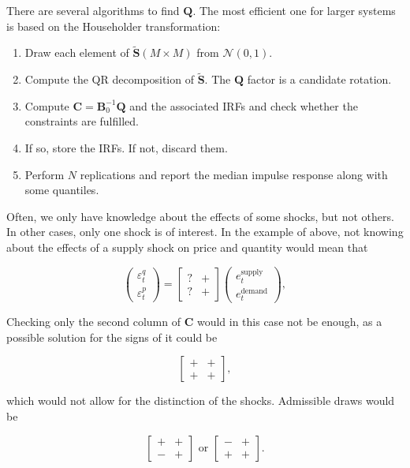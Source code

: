 There are several algorithms to find $\bm{Q}$. The most efficient one for larger systems is based on the Householder transformation:

\begin{enumerate}
	\item Draw each element of $\tilde{\bm{S}}(M\times M)$ from $\mathcal{N}(0,1)$. 
	\item Compute the QR decomposition of $\tilde{\bm{S}}$. The $\bm{Q}$ factor is a candidate rotation.
	\item Compute $\bm{C} = \bm{B}_0^{-1}\bm{Q}$ and the associated IRFs and check whether the constraints are fulfilled. 
	\item If so, store the IRFs. If not, discard them.
	\item Perform $N$ replications and report the median impulse response along with some quantiles.
\end{enumerate}

Often, we only have knowledge about the effects of some shocks, but not others. In other cases, only one shock is of interest. In the example of above, not knowing about the effects of a supply shock on price and quantity would mean that

\[
	\begin{pmatrix}
		\varepsilon_t^q \\
		\varepsilon_t^p
	\end{pmatrix}
	=
	\begin{bmatrix}
		? & + \\
		? & +
	\end{bmatrix}
	\begin{pmatrix}
		e_t^{\text{supply}} \\
		e_t^{\text{demand}}
	\end{pmatrix},
\]

Checking only the second column of $\bm{C}$ would in this case not be enough, as a possible solution for the signs of it could be

\[
	\begin{bmatrix}
		+ & + \\
		+ & +
	\end{bmatrix},
\]

which would not allow for the distinction of the shocks. Admissible draws would be

\[
	\begin{bmatrix}
		+ & + \\
		- & +
	\end{bmatrix}
	\text{ or }
	\begin{bmatrix}
		- & + \\
		+ & +
	\end{bmatrix}.
\]

